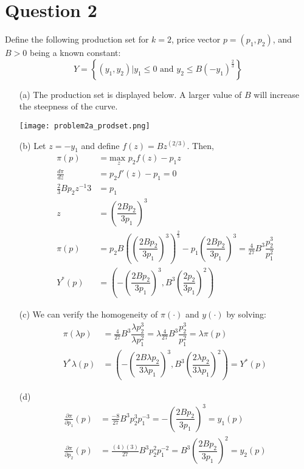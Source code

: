 \documentclass{article}
\begin{document}
\section*{Question 2}
Define the following production set for $k=2$, price vector $p=(p_1,p_2)$, and $B>0$ being a known constant:
\[
	Y=\left\{(y_1,y_2)|y_1\leq0\text{ and }y_2\leq B(-y_1)^{\frac{2}{3}} \right\}
\]
\begin{itemize}
	\item[(a)] The production set is displayed below. A larger value of $B$ will increase the steepness of the curve.
		\begin{center}
			\texttt{[image: problem2a\_prodset.png]}
		\end{center}
		
	\item[(b)] Let $z=-y_1$ and define $f(z)=Bz^{(2/3)}$. Then,
		\begin{align*}
			\pi(p) 						&= \underset{z}{\text{max }}p_2f(z)-p_1z	\\
			\frac{d\pi}{dz} 			&= p_2f'(z)-p_1 = 0							\\
			\frac{2}{3}Bp_2z^{-1}{3}	&= p_1										\\
			z							&= \left(\dfrac{2Bp_2}{3p_1}\right)^3		\\
			\pi(p)						&= p_2B\left(\left(\dfrac{2Bp_2}{3p_1}\right)^3\right)^{\frac{2}{3}}-p_1\left(\dfrac{2Bp_2}{3p_1}\right)^3 
										= \frac{4}{27}B^3\dfrac{p_2^3}{p_1^2}		\\
			Y^*(p)						&= \left( -\left(\dfrac{2Bp_2}{3p_1}\right)^3, B^3\left(\dfrac{2p_2}{3p_1}\right)^2 \right)
		\end{align*}
		
	\item[(c)] We can verify the homogeneity of $\pi(\cdot)$ and $y(\cdot)$ by solving:
		\begin{align*}
			\pi(\lambda p)	&= \frac{4}{27}B^3\dfrac{\lambda p_2^3}{\lambda p_1^2} = \lambda\frac{4}{27}B^3\dfrac{p_2^3}{p_1^2} = \lambda\pi(p)						\\
			Y^*\lambda (p)	&= \left( -\left(\dfrac{2B\lambda p_2}{3\lambda p_1}\right)^3, B^3\left(\dfrac{2\lambda p_2}{3 \lambda p_1}\right)^2 \right) = Y^*(p)
		\end{align*}
		
	\item[(d)]
		\begin{align*}
			 \frac{\partial \pi}{\partial p_1}(p) &= \frac{-8}{27}B^3p_2^3p_1^{-3} = -\left(\dfrac{2Bp_2}{3p_1}\right)^3 = y_1(p)	\\
			 \frac{\partial \pi}{\partial p_2}(p) &= \frac{(4)(3)}{27}B^3p_2^2p_1^{-2} = B^3\left(\dfrac{2Bp_2}{3p_1}\right)^2 = y_2(p)	
		\end{align*}
		

\end{itemize}
\end{document}

